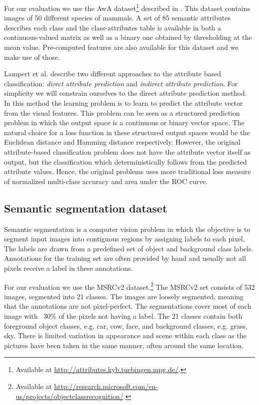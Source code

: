 For our evaluation we use the \acf{AwA} dataset\footnote{Available at \url{http://attributes.kyb.tuebingen.mpg.de/}.} described in \cite{lampert2009learning, lampert2014attribute}. This dataset contains images of 50 different species of mammals. A set of 85 semantic attributes describes each class and the class-attributes table is available in both a continuous-valued matrix as well as a binary one obtained by thresholding at the mean value. Pre-computed features are also available for this dataset and we make use of those.

Lampert et al. describe two different approaches to the attribute based classification: \emph{direct attribute prediction} and \emph{indirect attribute prediction}. For simplicity we will constrain ourselves to the direct attribute prediction method. In this method the learning problem is to learn to predict the attribute vector from the visual features. This problem can be seen as a structured prediction problem in which the output space is a continuous or binary vector space. The natural choice for a loss function in these structured output spaces would be the Euclidean distance and Hamming distance respectively. However, the original attribute-based classification problem does not have the attribute vector itself as output, but the classification which deterministically follows from the predicted attribute values. Hence, the original problems uses more traditional loss measure of normalized multi-class accuracy and area under the ROC curve.


\subsection{Semantic segmentation dataset}

Semantic segmentation is a computer vision problem in which the objective is to segment input images into contiguous regions by assigning labels to each pixel. The labels are drawn from a predefined set of object and background class labels. Annotations for the training set are often provided by hand and usually not all pixels receive a label in these annotations.

For our evaluation we use the \acf{MSRCv2} dataset.\footnote{Available at \url{http://research.microsoft.com/en-us/projects/objectclassrecognition/}.} The \ac{MSRCv2} set consists of 532 images, segmented into 21 classes. The images are loosely segmented, meaning that the annotations are not pixel-perfect. The segmentations cover most of each image with ~30\% of the pixels not having a label. The 21 classes contain both foreground object classes, e.g. car, cow, face, and background classes, e.g. grass, sky. There is limited variation in appearance and scene within each class as the pictures have been taken in the same manner, often around the same location.

